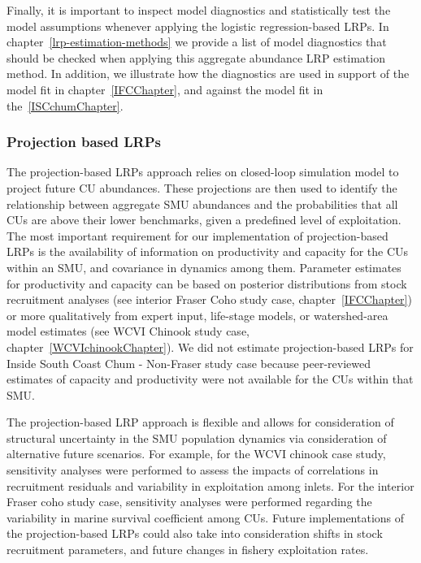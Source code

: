 \documentclass[11pt]{book}
\begin{document}
Finally, it is important to inspect model diagnostics and statistically test the model assumptions whenever applying the logistic regression-based LRPs. In chapter~\ref{lrp-estimation-methods} we provide a list of model diagnostics that should be checked when applying this aggregate abundance LRP estimation method. In addition, we illustrate how the diagnostics are used in support of the model fit in chapter~\ref{IFCChapter}, and against the model fit in the~\ref{ISCchumChapter}.

\hypertarget{projection-based-lrps}{%
\subsubsection{Projection based LRPs}\label{projection-based-lrps}}

The projection-based LRPs approach relies on closed-loop simulation model to project future CU abundances. These projections are then used to identify the relationship between aggregate SMU abundances and the probabilities that all CUs are above their lower benchmarks, given a predefined level of exploitation. The most important requirement for our implementation of projection-based LRPs is the availability of information on productivity and capacity for the CUs within an SMU, and covariance in dynamics among them. Parameter estimates for productivity and capacity can be based on posterior distributions from stock recruitment analyses (see interior Fraser Coho study case, chapter~\ref{IFCChapter}) or more qualitatively from expert input, life-stage models, or watershed-area model estimates (see WCVI Chinook study case, chapter~\ref{WCVIchinookChapter}). We did not estimate projection-based LRPs for Inside South Coast Chum - Non-Fraser study case because peer-reviewed estimates of capacity and productivity were not available for the CUs within that SMU.

The projection-based LRP approach is flexible and allows for consideration of structural uncertainty in the SMU population dynamics via consideration of alternative future scenarios. For example, for the WCVI chinook case study, sensitivity analyses were performed to assess the impacts of correlations in recruitment residuals and variability in exploitation among inlets. For the interior Fraser coho study case, sensitivity analyses were performed regarding the variability in marine survival coefficient among CUs. Future implementations of the projection-based LRPs could also take into consideration shifts in stock recruitment parameters, and future changes in fishery exploitation rates.
\end{document}
